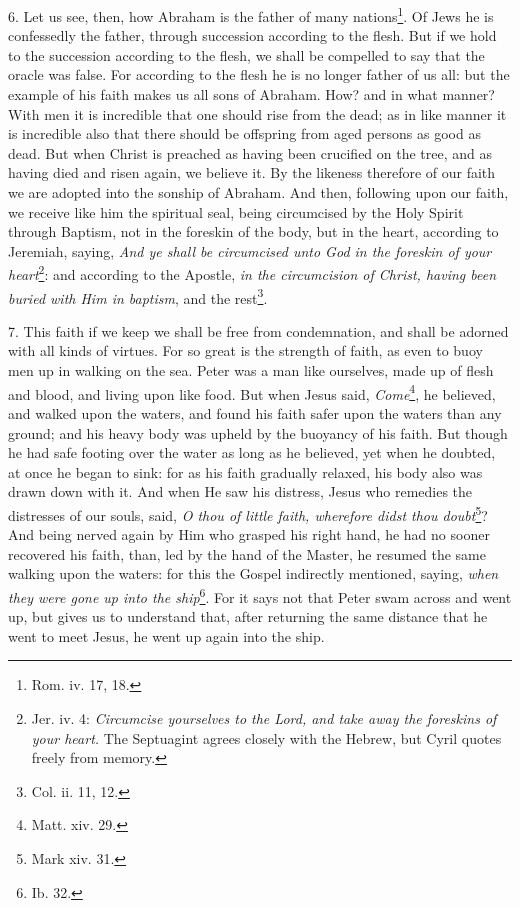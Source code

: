 6. Let us see, then, how Abraham is the father of many nations\footnote{Rom. iv. 17, 18.}. Of Jews he is confessedly the father, through succession according to the flesh. But if we hold to the succession according to the flesh, we shall be compelled to say that the oracle was false. For according to the flesh he is no longer father of us all: but the example of his faith makes us all sons of Abraham. How? and in what manner? With men it is incredible that one should rise from the dead; as in like manner it is incredible also that there should be offspring from aged persons as good as dead. But when Christ is preached as having been crucified on the tree, and as having died and risen again, we believe it. By the likeness therefore of our faith we are adopted into the sonship of Abraham. And then, following upon our faith, we receive like him the spiritual seal, being circumcised by the Holy Spirit through Baptism, not in the foreskin of the body, but in the heart, according to Jeremiah, saying, \emph{And ye shall be circumcised unto God in the foreskin of your heart}\footnote{Jer. iv. 4: \emph{Circumcise yourselves to the Lord, and take away the foreskins of your heart.} The Septuagint agrees closely with the Hebrew, but Cyril quotes freely from memory.}: and according to the Apostle, \emph{in the circumcision of Christ, having been buried with Him in baptism}, and the rest\footnote{Col. ii. 11, 12.}.

7. This faith if we keep we shall be free from condemnation, and shall be adorned with all kinds of virtues. For so great is the strength of faith, as even to buoy men up in walking on the sea. Peter was a man like ourselves, made up of flesh and blood, and living upon like food. But when Jesus said, \emph{Come}\footnote{Matt. xiv. 29.}, he believed, and walked upon the waters, and found his faith safer upon the waters than any ground; and his heavy body was upheld by the buoyancy of his faith. But though he had safe footing over the water as long as he believed, yet when he doubted, at once he began to sink: for as his faith gradually relaxed, his body also was drawn down with it. And when He saw his distress, Jesus who remedies the distresses of our souls, said, \emph{O thou of little faith, wherefore didst thou doubt}\footnote{Mark xiv. 31.}? And being nerved again by Him who grasped his right hand, he had no sooner recovered his faith, than, led by the hand of the Master, he resumed the same walking upon the waters: for this the Gospel indirectly mentioned, saying, \emph{when they were gone up into the ship}\footnote{Ib. 32.}. For it says not that Peter swam across and went up, but gives us to understand that, after returning the same distance that he went to meet Jesus, he went up again into the ship.

